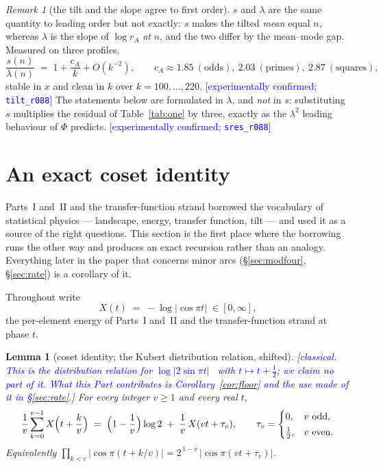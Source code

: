 \documentclass[11pt,a4paper]{article}
\theoremstyle{plain}
\newtheorem{lemma}[theorem]{Lemma}
\theoremstyle{definition}
\theoremstyle{remark}
\newtheorem{remark}[theorem]{Remark}
\newcommand{\STATUS}[1]{\textcolor{blue}{\textsf{[#1]}}}
\begin{document}
\begin{remark}[the tilt and the slope agree to first order]\label{rem:tiltslope}
$s$ and $\lambda$ are the same quantity to leading order but not exactly: $s$ makes the
tilted \emph{mean} equal $n$, whereas $\lambda$ is the slope of $\log r_A$ \emph{at} $n$, and
the two differ by the mean--mode gap. Measured on three profiles,
\[
   \frac{s(n)}{\lambda(n)}\;=\;1+\frac{c_A}{k}+O(k^{-2}),
   \qquad c_A\approx1.85\ (\text{odds}),\ 2.03\ (\text{primes}),\ 2.87\ (\text{squares}),
\]
stable in $x$ and clean in $k$ over $k=100,\dots,220$.
\STATUS{experimentally confirmed; \texttt{tilt\_r088}}
The statements below are formulated in $\lambda$, and \emph{not} in $s$: substituting $s$
multiplies the residual of Table~\ref{tab:one} by three, exactly as the $\lambda^{2}$ leading
behaviour of $\Phi$ predicts. \STATUS{experimentally confirmed; \texttt{sres\_r088}}
\end{remark}

\section{An exact coset identity}\label{sec:coset}

Parts~I and~II and the transfer-function strand borrowed the vocabulary of statistical physics --- landscape, energy, transfer
function, tilt --- and used it as a source of the right questions. This section is the first
place where the borrowing runs the other way and produces an exact recursion rather than an
analogy. Everything later in the paper that concerns minor arcs
(\S\ref{sec:modfour}, \S\ref{sec:rate}) is a corollary of it.

Throughout write
\[
   X(t)\;=\;-\log|\cos\pi t|\;\in[0,\infty],
\]
the per-element energy of Parts~I and~II and the transfer-function strand at phase $t$.

\begin{lemma}[coset identity; the Kubert distribution relation, shifted]\label{lem:coset}
\STATUS{classical. This is the distribution relation for $\log|2\sin\pi t|$~\cite{KL} with
$t\mapsto t+\tfrac12$; we claim no part of it. What this Part contributes is
Corollary~\ref{cor:floor} and the use made of it in \S\ref{sec:rate}.}
For every integer $v\ge1$ and every real $t$,
\[
   \frac1v\sum_{k=0}^{v-1}X\Bigl(t+\frac kv\Bigr)
   \;=\;\Bigl(1-\frac1v\Bigr)\log2\;+\;\frac1v\,X(vt+\tau_v),
   \qquad
   \tau_v=\begin{cases}0,&v\text{ odd},\\[2pt]\tfrac12,&v\text{ even}.\end{cases}
\]
Equivalently $\prod_{k<v}|\cos\pi(t+k/v)|=2^{\,1-v}\,|\cos\pi(vt+\tau_v)|$.
\end{lemma}
\end{document}
